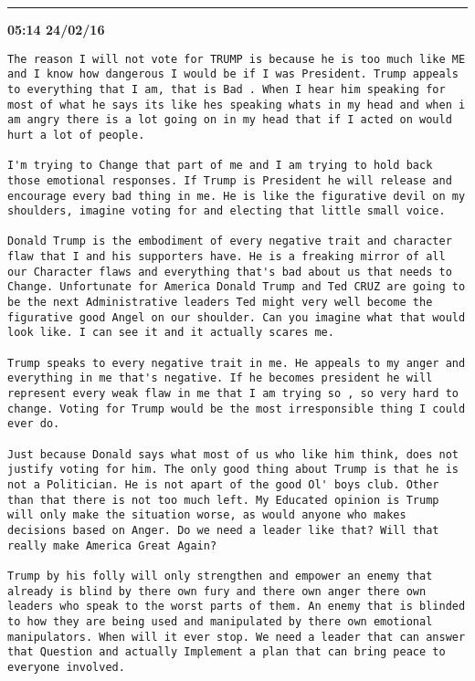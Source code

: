 \hrule%

\begin{adjustwidth}{0cm}{0cm}
\footnotesize \textbf{05:14 24/02/16}

\begin{lstlisting}[breaklines, breakatwhitespace, basicstyle=\small, frame=leftline]
The reason I will not vote for TRUMP is because he is too much like ME and I know how dangerous I would be if I was President. Trump appeals to everything that I am, that is Bad . When I hear him speaking for most of what he says its like hes speaking whats in my head and when i am angry there is a lot going on in my head that if I acted on would hurt a lot of people.

I'm trying to Change that part of me and I am trying to hold back those emotional responses. If Trump is President he will release and encourage every bad thing in me. He is like the figurative devil on my shoulders, imagine voting for and electing that little small voice.

Donald Trump is the embodiment of every negative trait and character flaw that I and his supporters have. He is a freaking mirror of all our Character flaws and everything that's bad about us that needs to Change. Unfortunate for America Donald Trump and Ted CRUZ are going to be the next Administrative leaders Ted might very well become the figurative good Angel on our shoulder. Can you imagine what that would look like. I can see it and it actually scares me.

Trump speaks to every negative trait in me. He appeals to my anger and everything in me that's negative. If he becomes president he will represent every weak flaw in me that I am trying so , so very hard to change. Voting for Trump would be the most irresponsible thing I could ever do.

Just because Donald says what most of us who like him think, does not justify voting for him. The only good thing about Trump is that he is not a Politician. He is not apart of the good Ol' boys club. Other than that there is not too much left. My Educated opinion is Trump will only make the situation worse, as would anyone who makes decisions based on Anger. Do we need a leader like that? Will that really make America Great Again?

Trump by his folly will only strengthen and empower an enemy that already is blind by there own fury and there own anger there own leaders who speak to the worst parts of them. An enemy that is blinded to how they are being used and manipulated by there own emotional manipulators. When will it ever stop. We need a leader that can answer that Question and actually Implement a plan that can bring peace to everyone involved.


\end{lstlisting}
\end{adjustwidth}
